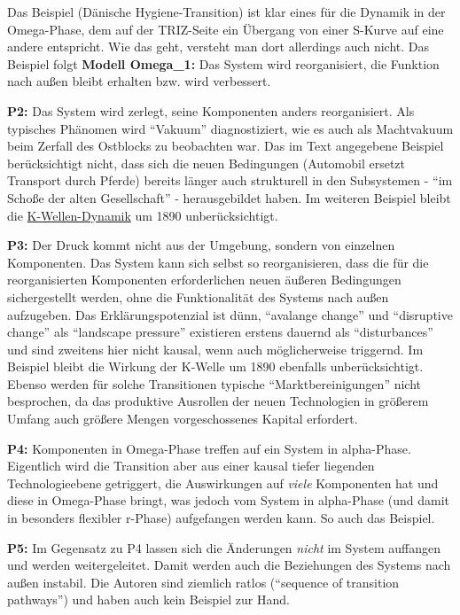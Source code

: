 \documentclass[11pt,a4paper]{article}
\begin{document}
Das Beispiel (Dänische Hygiene-Transition) ist klar eines für die
Dynamik in der Omega-Phase, dem auf der TRIZ-Seite ein Übergang von
einer S-Kurve auf eine andere entspricht. Wie das geht, versteht man
dort allerdings auch nicht. Das Beispiel folgt \textbf{Modell Omega\_1:}
Das System wird reorganisiert, die Funktion nach außen bleibt erhalten
bzw. wird verbessert.

\textbf{P2:} Das System wird zerlegt, seine Komponenten anders
reorganisiert. Als typisches Phänomen wird ``Vakuum'' diagnostiziert,
wie es auch als Machtvakuum beim Zerfall des Ostblocks zu beobachten
war. Das im Text angegebene Beispiel berücksichtigt nicht, dass sich die
neuen Bedingungen (Automobil ersetzt Transport durch Pferde) bereits
länger auch strukturell in den Subsystemen - ``im Schoße der alten
Gesellschaft'' - herausgebildet haben. Im weiteren Beispiel bleibt die
\href{https://www.kondratieff.net/kondratieffzyklen}{K-Wellen-Dynamik}
um 1890 unberücksichtigt.

\textbf{P3:} Der Druck kommt nicht aus der Umgebung, sondern von
einzelnen Komponenten. Das System kann sich selbst so reorganisieren,
dass die für die reorganisierten Komponenten erforderlichen neuen
äußeren Bedingungen sichergestellt werden, ohne die Funktionalität des
Systems nach außen aufzugeben. Das Erklärungspotenzial ist dünn,
``avalange change'' und ``disruptive change'' als ``landscape pressure''
existieren erstens dauernd als ``disturbances'' und sind zweitens hier
nicht kausal, wenn auch möglicherweise triggernd. Im Beispiel bleibt die
Wirkung der K-Welle um 1890 ebenfalls unberücksichtigt. Ebenso werden
für solche Transitionen typische ``Marktbereinigungen'' nicht
besprochen, da das produktive Ausrollen der neuen Technologien in
größerem Umfang auch größere Mengen vorgeschossenes Kapital erfordert.

\textbf{P4:} Komponenten in Omega-Phase treffen auf ein System in
alpha-Phase. Eigentlich wird die Transition aber aus einer kausal tiefer
liegenden Technologieebene getriggert, die Auswirkungen auf \emph{viele}
Komponenten hat und diese in Omega-Phase bringt, was jedoch vom System
in alpha-Phase (und damit in besonders flexibler r-Phase) aufgefangen
werden kann. So auch das Beispiel.

\textbf{P5:} Im Gegensatz zu P4 lassen sich die Änderungen \emph{nicht}
im System auffangen und werden weitergeleitet. Damit werden auch die
Beziehungen des Systems nach außen instabil. Die Autoren sind ziemlich
ratlos (``sequence of transition pathways'') und haben auch kein
Beispiel zur Hand.
\end{document}
